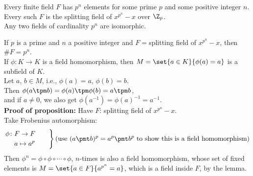 Every finite field $F$ has $p^n$ elements for some prime $p$ and some positive integer $n$. \\
Every such $F$ is the splitting field of $x^{p^n}-x$ over $\Z_p$. \\
Any two fields of cardinality $p^n$ are isomorphic.

\prop If $p$ is a prime and $n$ a positive integer and $F={}$splitting field of $x^{p^n}-x$, then $\#F=p^n$. \\
\lem If $\phi\colon K\to K$ is a field homomorphism, then $M=\set{a\in K}{\phi(a)=a}$ is a subfield of $K$. \\
\pf Let $a$, $b\in M$, i.e., $\phi(a)=a$, $\phi(b)=b$. \\
Then $\phi(a\tpm b)=\phi(a)\tpm\phi(b)=a\tpm b$, \\
and if $a\neq0$, we also get $\phi(a^{-1})=\phi(a)^{-1}=a^{-1}$. \\
\textbf{Proof of proposition:} Have $F$: splitting field of $x^{p^n}-x$. \\
Take Frobenius automorphism:
\[\left.\begin{aligned}
\phi\colon & F \to F \\
& a \mapsto a^p
\end{aligned}\qquad\right\}\text{(use $(a\pmt b)^p=a^p\pmt b^p$ to show this is a field homomorphism)}\]
Then $\phi^n=\phi\circ\phi\circ\dotsb\circ\phi$, $n$-times is also a field homomorphism, whose set of fixed elements is $M=\set{a\in F}{a^{p^n}=a}$, which is a field inside $F$, by the lemma.

